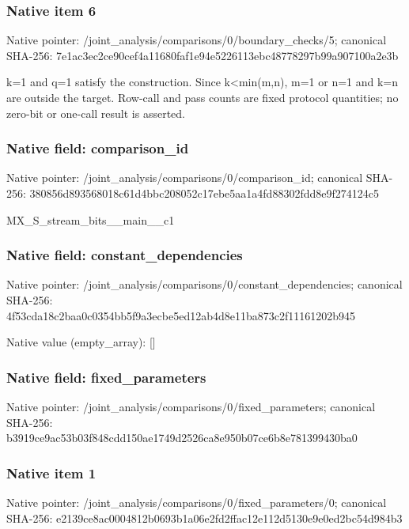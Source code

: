 \documentclass[10pt,a4paper]{article}
\begin{document}
\subsubsection{Native item 6}
Native pointer: /joint\_\allowbreak{}analysis/comparisons/0/boundary\_\allowbreak{}checks/5; canonical SHA-256: 7e1ac3ec2ce90cef4a11680faf1e94e5226113ebc48778297b99a907100a2e3b

\begingroup\raggedright\sloppy k=\allowbreak{}1 and q=\allowbreak{}1 satisfy the construction. Since k<min(m,\allowbreak{}n),\allowbreak{} m=\allowbreak{}1 or n=\allowbreak{}1 and k=\allowbreak{}n are outside the target. Row-call and pass counts are fixed protocol quantities;\allowbreak{} no zero-bit or one-call result is asserted.\par\endgroup

\subsubsection{Native field: comparison\_\allowbreak{}id}
Native pointer: /joint\_\allowbreak{}analysis/comparisons/0/comparison\_\allowbreak{}id; canonical SHA-256: 380856d893568018c61d4bbc208052c17ebe5aa1a4fd88302fdd8e9f274124c5

\begingroup\raggedright\sloppy MX\_\allowbreak{}S\_\allowbreak{}stream\_\allowbreak{}bits\_\allowbreak{}\_\allowbreak{}main\_\allowbreak{}\_\allowbreak{}c1\par\endgroup

\subsubsection{Native field: constant\_\allowbreak{}dependencies}
Native pointer: /joint\_\allowbreak{}analysis/comparisons/0/constant\_\allowbreak{}dependencies; canonical SHA-256: 4f53cda18c2baa0c0354bb5f9a3ecbe5ed12ab4d8e11ba873c2f11161202b945

Native value (empty\_\allowbreak{}array): []

\subsubsection{Native field: fixed\_\allowbreak{}parameters}
Native pointer: /joint\_\allowbreak{}analysis/comparisons/0/fixed\_\allowbreak{}parameters; canonical SHA-256: b3919ce9ac53b03f848cdd150ae1749d2526ca8e950b07ce6b8e781399430ba0

\subsubsection{Native item 1}
Native pointer: /joint\_\allowbreak{}analysis/comparisons/0/fixed\_\allowbreak{}parameters/0; canonical SHA-256: e2139ce8ac0004812b0693b1a06e2fd2ffac12e112d5130e9e0ed2bc54d984b3
\end{document}
